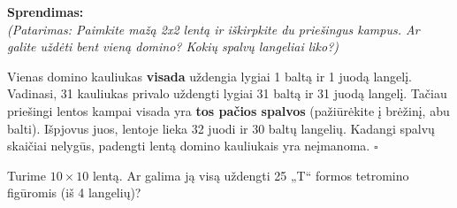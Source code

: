 \documentclass[11pt,a4paper]{scrartcl}
\newenvironment{solution}
    {\begin{list}{}{\setlength{\leftmargin}{10pt}\setlength{\rightmargin}{10pt}}\item[]}
    {\end{list}}
\begin{document}
\begin{minipage}{0.6\textwidth}
\begin{solution}
\textbf{Sprendimas:}\\
\textit{(Patarimas: Paimkite mažą 2x2 lentą ir iškirpkite du priešingus kampus. Ar galite uždėti bent vieną domino? Kokių spalvų langeliai liko?)}

Vienas domino kauliukas \textbf{visada} uždengia lygiai 1 baltą ir 1 juodą langelį. Vadinasi, 31 kauliukas privalo uždengti lygiai 31 baltą ir 31 juodą langelį.
Tačiau priešingi lentos kampai visada yra \textbf{tos pačios spalvos} (pažiūrėkite į brėžinį, abu balti). Išpjovus juos, lentoje lieka 32 juodi ir 30 baltų langelių. Kadangi spalvų skaičiai nelygūs, padengti lentą domino kauliukais yra neįmanoma. \hfill $\square$
\end{solution}
\end{minipage}
\hfill
\begin{minipage}{0.35\textwidth}
\centering
{}
\end{minipage}

\vspace{0.5cm}

\begin{example}
Turime $10 \times 10$ lentą. Ar galima ją visą uždengti 25 „T“ formos tetromino figūromis (iš 4 langelių)?
\end{example}
\end{document}
